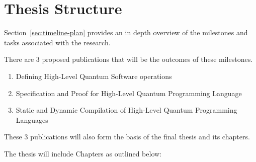 \documentclass[journal,onecolumn, compsoc]{IEEEtran}
\begin{document}
\section{Thesis Structure}
Section~\ref{sec:timeline-plan} provides an in depth overview of the milestones and tasks associated with the research.

There are 3 proposed publications that will be the outcomes of these milestones.
\begin{enumerate}
    \item Defining High-Level Quantum Software operations
    \item Specification and Proof for High-Level Quantum Programming Language
    \item Static and Dynamic Compilation of High-Level Quantum Programming Languages
\end{enumerate}

These 3 publications will also form the basis of the final thesis and its chapters.

The thesis will include Chapters as outlined below:
\end{document}

